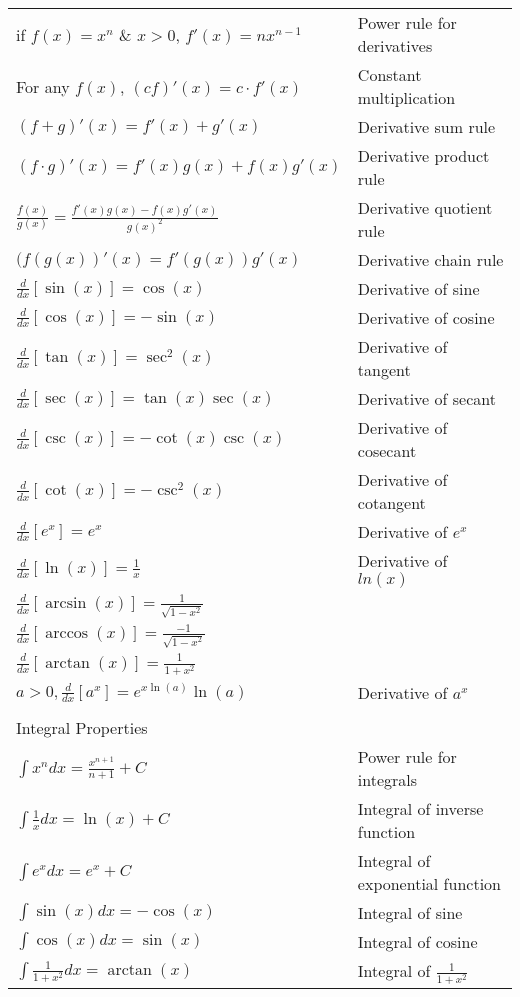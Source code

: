 \documentclass[12pt]{amsart}
\begin{document}
\begin{center}
\begin{tabularx}{\textwidth}{ X l }
	if $f(x) = x^n$ \& $x > 0$, $f'(x) = nx^{n-1}$ & Power rule for derivatives \\
	For any $f(x)$, $(cf)'(x) = c\cdot f'(x)$ & Constant multiplication \\
	$(f + g)'(x) = f'(x) + g'(x)$ & Derivative sum rule \\
	$(f \cdot g)'(x) = f'(x)g(x) + f(x)g'(x)$ & Derivative product rule \\
	$\frac{f(x)}{g(x)} = \frac{f'(x)g(x) - f(x)g'(x)}{g(x)^2}$ & Derivative quotient rule \\
	$(f(g(x))'(x) = f'(g(x))g'(x)$ & Derivative chain rule \\
	$\frac{d}{dx}[\sin(x)] = \cos(x)$ & Derivative of sine \\
	$\frac{d}{dx}[\cos(x)] = -\sin(x)$ & Derivative of cosine \\
	$\frac{d}{dx}[\tan(x)] = \sec^2(x)$ & Derivative of tangent\\
	$\frac{d}{dx}[\sec(x)] = \tan(x)\sec(x)$ & Derivative of secant\\
	$\frac{d}{dx}[\csc(x)] = -\cot(x)\csc(x)$ & Derivative of cosecant\\
	$\frac{d}{dx}[\cot(x)] = -\csc^2(x)$ & Derivative of cotangent\\
	$\frac{d}{dx}[e^x] = e^x$ & Derivative of $e^x$\\
	$\frac{d}{dx}[\ln(x)] = \frac{1}{x}$ & Derivative of $ln(x)$\\
	$\frac{d}{dx}[\arcsin(x)] = \frac{1}{\sqrt{1 - x^2}}$\\
	$\frac{d}{dx}[\arccos(x)] = \frac{-1}{\sqrt{1 - x^2}}$\\
	$\frac{d}{dx}[\arctan(x)] = \frac{1}{1 + x^2}$\\
	$a > 0, \frac{d}{dx}[a^x] = e^{x\ln(a)}\ln(a)$ & Derivative of $a^x$\\
	\\Integral Properties\\ \hline
	$\int x^n dx = \frac{x^{n+1}}{n+1} + C$ & Power rule for integrals\\
	$\int \frac{1}{x} dx = \ln(x) + C$ & Integral of inverse function\\
	$\int e^x dx = e^x + C$ & Integral of exponential function\\
	$\int \sin(x) dx = -\cos(x) $ & Integral of sine\\
	$\int \cos(x) dx = \sin(x) $ & Integral of cosine\\
	$\int \frac{1}{1 + x^2} dx = \arctan(x) $ & Integral of $\frac{1}{1 + x^2}$ \\
\end{tabularx}
\end{center}
\end{document}
